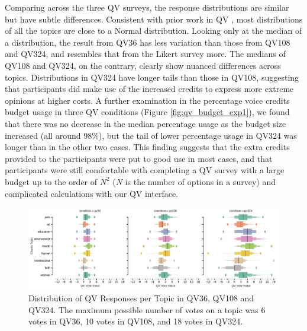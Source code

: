Comparing across the three QV surveys, the response distributions are similar but have subtle differences. Consistent with prior work in QV \cite{quarfoot2017quadratic}, most distributions of all the topics are close to a Normal distribution. Looking only at the median of a distribution, the result from QV36 has less variation than those from QV108 and QV324, and resembles that from the Likert survey more. The medians of QV108 and QV324, on the contrary, clearly show nuanced differences across topics. Distributions in QV324 have longer tails than those in QV108, suggesting that participants did make use of the increased credits to express more extreme opinions at higher costs. A further examination in the percentage voice credits budget usage in three QV conditions (Figure \ref{fig:qv_budget_exp1}), we found that there was no decrease in the median percentage usage as the budget size increased (all around 98\%), but the tail of lower percentage usage in QV324 was longer than in the other two cases. This finding suggests that the extra credits provided to the participants were put to good use in most cases, and that participants were still comfortable with completing a QV survey with a large budget up to the order of $N^2$ ($N$ is the number of options in a survey) and complicated calculations with our QV interface. %

\begin{figure}[htpb]
    \centering
    \includegraphics[width=\textwidth, keepaspectratio=true]{content/image/qv_distribution_per_topic.pdf}
    \caption{
      Distribution of QV Responses per Topic in QV36, QV108 and QV324. The maximum possible number of votes on a topic was 6 votes in QV36, 10 votes in QV108, and 18 votes in QV324.
    }
    \label{fig:qv3_exp1}
\end{figure}


